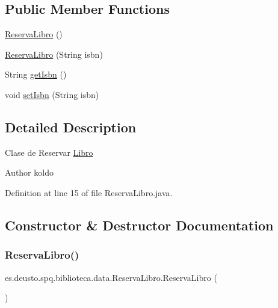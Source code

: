 \subsection*{Public Member Functions}
\begin{DoxyCompactItemize}
\item 
\mbox{\hyperlink{classes_1_1deusto_1_1spq_1_1biblioteca_1_1data_1_1_reserva_libro_a544240903bba917dc3b864f09d365492}{Reserva\+Libro}} ()
\item 
\mbox{\hyperlink{classes_1_1deusto_1_1spq_1_1biblioteca_1_1data_1_1_reserva_libro_a8afc233a3999c5c68fc03eda09428afd}{Reserva\+Libro}} (String isbn)
\item 
String \mbox{\hyperlink{classes_1_1deusto_1_1spq_1_1biblioteca_1_1data_1_1_reserva_libro_afca610a6ce88f886269834aec8ff4832}{get\+Isbn}} ()
\item 
void \mbox{\hyperlink{classes_1_1deusto_1_1spq_1_1biblioteca_1_1data_1_1_reserva_libro_ac4d752a8b40d57f462120856da5661df}{set\+Isbn}} (String isbn)
\end{DoxyCompactItemize}


\subsection{Detailed Description}
Clase de Reservar \mbox{\hyperlink{classes_1_1deusto_1_1spq_1_1biblioteca_1_1data_1_1_libro}{Libro}} \begin{DoxyAuthor}{Author}
koldo 
\end{DoxyAuthor}


Definition at line 15 of file Reserva\+Libro.\+java.



\subsection{Constructor \& Destructor Documentation}
\mbox{\label{classes_1_1deusto_1_1spq_1_1biblioteca_1_1data_1_1_reserva_libro_a544240903bba917dc3b864f09d365492}} 
\subsubsection{\texorpdfstring{Reserva\+Libro()}{ReservaLibro()}\hspace{0.1cm}{\footnotesize\ttfamily [1/2]}}
{\footnotesize\ttfamily es.\+deusto.\+spq.\+biblioteca.\+data.\+Reserva\+Libro.\+Reserva\+Libro (\begin{DoxyParamCaption}{ }\end{DoxyParamCaption})}

